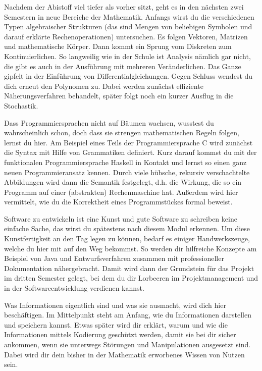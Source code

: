 
Nachdem der Abistoff viel tiefer als vorher sitzt, geht es in den nächsten zwei Semestern in neue Bereiche der Mathematik.
Anfangs wirst du die verschiedenen Typen algebraischer Strukturen (das sind Mengen von beliebigen Symbolen und darauf erklärte Rechenoperationen) untersuchen.
Es folgen Vektoren, Matrizen und mathematische Körper.
Dann kommt ein Sprung vom Diskreten zum Kontinuierlichen.
So langweilig wie in der Schule ist Analysis nämlich gar nicht, die gibt es auch in der Ausführung mit mehreren Veränderlichen.
Das Ganze gipfelt in der Einführung von Differentialgleichungen.
Gegen Schluss wendest du dich erneut den Polynomen zu.
Dabei werden zunächst effiziente Näherungsverfahren behandelt, später folgt noch ein kurzer Ausflug in die Stochastik.

Dass Programmiersprachen nicht auf Bäumen wachsen, wusstest du wahrscheinlich schon, doch dass sie strengen mathematischen Regeln folgen, lernst du hier.
Am Beispiel eines Teils der Programmiersprache C wird zunächst die Syntax mit Hilfe von Grammatiken definiert.
Kurz darauf kommst du mit der funktionalen Programmiersprache Haskell in Kontakt und lernst so einen ganz neuen Programmieransatz kennen.
Durch viele hübsche, rekursiv verschachtelte Abbildungen wird dann die Semantik festgelegt, d.h. die Wirkung, die so ein Programm auf einer (abstrakten) Rechenmaschine hat.
Außerdem wird hier vermittelt, wie du die Korrektheit eines Programmstückes formal beweist.

Software zu entwickeln ist eine Kunst und gute Software zu schreiben keine einfache Sache, das wirst du spätestens nach diesem Modul erkennen.
Um diese Kunstfertigkeit an den Tag legen zu können, bedarf es einiger Handwerkszeuge, welche du hier mit auf den Weg bekommst.
So werden dir hilfreiche Konzepte am Beispiel von Java und Entwurfsverfahren zusammen mit professioneller Dokumentation nähergebracht.
Damit wird dann der Grundstein für das Projekt im dritten Semester gelegt, bei dem du dir Lorbeeren im Projektmanagement und in der Softwareentwicklung verdienen kannst.


\newpage

Was Informationen eigentlich sind und was sie ausmacht, wird dich hier beschäftigen.
Im Mittelpunkt steht am Anfang, wie du Informationen darstellen und speichern kannst.
Etwas später wird dir erklärt, warum und wie die Informationen mittels Kodierung geschützt werden, damit sie bei dir sicher ankommen, wenn sie unterwegs Störungen und Manipulationen ausgesetzt sind.
Dabei wird dir dein bisher in der Mathematik erworbenes Wissen von Nutzen sein.

